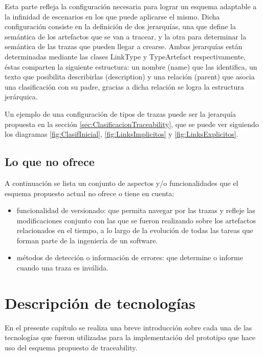 \documentclass[a4paper,12pt,oneside]{book}
\begin{document}
Esta parte refleja la configuración necesaria para lograr un esquema adaptable a la infinidad de escenarios en los que puede aplicarse el mismo. Dicha configuración consiste en la definición de dos jerarquías, una que define la semántica de los artefactos que se van a tracear, y la otra para determinar la semántica de las trazas que pueden llegar a crearse. Ambas jerarquías están determinadas mediante las clases LinkType y TypeArtefact respectivamente, éstas comparten la siguiente estructura: un nombre (name) que las identifica, un texto que posibilita describirlas (description) y una relación (parent) que asocia una clasificación con su padre, gracias a dicha relación se logra la estructura jerárquica.

Un ejemplo de una configuración de tipos de trazas puede ser la jerarquía propuesta en la sección \ref{sec:ClasificacionTraceability}, que se puede ver siguiendo los diagramas \ref{fig:ClasifInicial}, \ref{fig:LinksImplicitos} y \ref{fig:LinksExplicitos}.


\section{Lo que no ofrece}

A continuación se lista un conjunto de aspectos y/o funcionalidades que el esquema propuesto actual no ofrece o tiene en cuenta:

\begin{itemize}

\item funcionalidad de versionado: que permita navegar por las trazas y refleje las modificaciones conjunto con las que se fueron realizando sobre los artefactos relacionados en el tiempo, a lo largo de la evolución de todas las tareas que forman parte de la ingeniería de un software.

\item métodos de detección o información de errores: que determine o informe cuando una traza es inválida.

\end{itemize}

\chapter{Descripción de tecnologías}

En el presente capítulo se realiza una breve introducción sobre cada una de las tecnologías que fueron utilizadas para la implementación del prototipo que hace uso del esquema propuesto de traceability.
\end{document}
